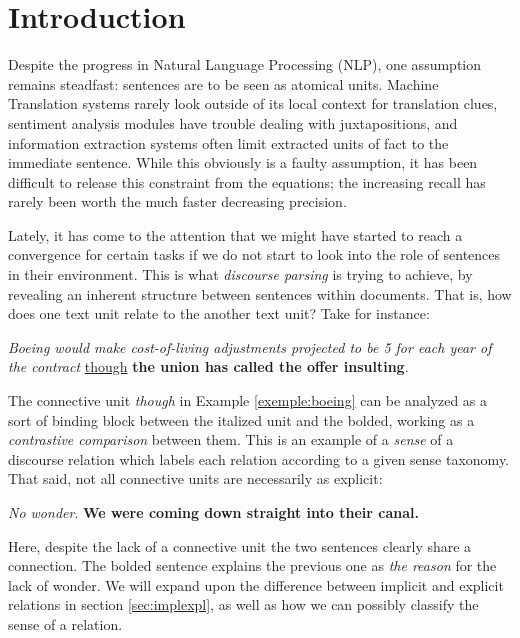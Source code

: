 \chapter{Introduction}

Despite the progress in Natural Language Processing (NLP), one assumption remains steadfast: sentences are to be seen as atomical units. Machine Translation systems rarely look outside of its local context for translation clues, sentiment analysis modules have trouble dealing with juxtapositions, and information extraction systems often limit extracted units of fact to the immediate sentence. While this  obviously is a faulty assumption, it has been difficult to release this constraint from the equations; the increasing recall has rarely been worth the much faster decreasing precision.

Lately, it has come to the attention that we might have started to reach a convergence for certain tasks if we do not start to look into the role of sentences in their environment. This is what \emph{discourse parsing} is trying to achieve, by revealing an inherent structure between sentences within documents. That is, how does one text unit relate to the another text unit? Take for instance:

\begin{exe}
\ex \emph{Boeing would make cost-of-living adjustments projected to be 5 for each year of the contract} \underline{though} \textbf{the union has called the offer insulting}.\label{exemple:boeing}
\end{exe}

The connective unit \emph{though} in Example \ref{exemple:boeing} can be analyzed as a sort of binding block between the italized unit and the bolded, working as a \emph{contrastive comparison} between them. This is an example of a \emph{sense} of a discourse relation which labels each relation according to a given sense taxonomy. That said, not all connective units are necessarily as explicit:

\begin{exe}
\ex \emph{No wonder}. \textbf{We were coming down straight into their canal.}\label{exemple:nowonder}
\end{exe}

Here, despite the lack of a connective unit the two sentences clearly share a connection. The bolded sentence explains the previous one as \emph{the reason} for the lack of wonder. We will expand upon the difference between implicit and explicit relations in section \ref{sec:implexpl}, as well as how we can possibly classify the sense of a relation.

